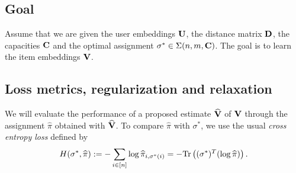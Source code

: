 \subsection*{Goal} Assume that we are given the user embeddings $\mathbf{U}$, the
distance matrix $\mathbf{D}$, the capacities $\mathbf{C}$ and the optimal assignment $\sigma^*
    \in \Sigma(n,m,\mathbf{C})$. The goal is to learn the item embeddings $\mathbf{V}$.

\subsection*{Loss metrics, regularization and relaxation}
We will evaluate the performance of a proposed estimate $\widehat{\mathbf{V}}$ of $\mathbf{V}$
through the assignment $\widehat{\pi}$ obtained with $\widehat{\mathbf{V}}$. To compare
$\widehat{\pi}$ with $\sigma^*$, we use the usual \emph{cross entropy loss}
defined by
\begin{equation*}
    H(\sigma^*,\widehat{\pi}) := - \sum_{i \in [n]} \log{\widehat{\pi}_{i,\sigma^*(i)}} = - {\rm Tr}\left( (\sigma^*)^T (\log \widehat{\pi}) \right).
\end{equation*}



